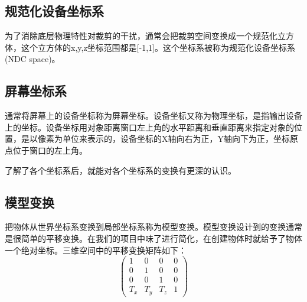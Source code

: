     \subsection{规范化设备坐标系}
    \begin{spacing}{2.5}
    为了消除底层物理特性对裁剪的干扰，通常会把裁剪空间变换成一个规范化立方体，这个立方体的x,y,z坐标范围都是[-1,1]。这个坐标系被称为规范化设备坐标系(NDC space)。
    \end{spacing}
    
    \subsection{屏幕坐标系}
    \begin{spacing}{2.5}
    通常将屏幕上的设备坐标称为屏幕坐标。设备坐标又称为物理坐标，是指输出设备上的坐标。设备坐标用对象距离窗口左上角的水平距离和垂直距离来指定对象的位置，是以像素为单位来表示的，设备坐标的X轴向右为正，Y轴向下为正，坐标原点位于窗口的左上角。\\
    \end{spacing}
    
	了解了各个坐标系后，就能对各个坐标系的变换有更深的认识。
	\subsection{模型变换}
	\begin{spacing}{2.5}
		把物体从世界坐标系变换到局部坐标系称为模型变换。模型变换设计到的变换通常是很简单的平移变换。在我们的项目中味了进行简化，在创建物体时就给予了物体一个绝对坐标。三维空间中的平移变换矩阵如下：
		\begin{equation}
		\begin{pmatrix}
			1 &  0&  0&0 \\ 
 			0&  1&  0& 0\\ 
 			0& 0 & 1 &0 \\ 
 			T_{x}&  T_{y}&  T_{z}& 1
		\end{pmatrix}
		\label{transfer}
		\end{equation}
	\end{spacing}
	

